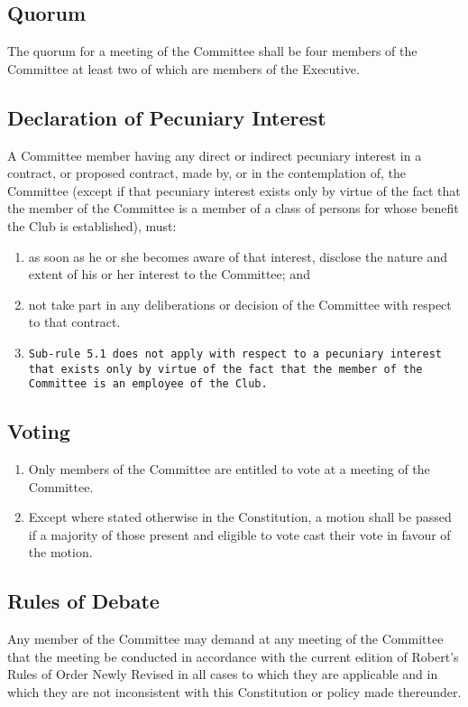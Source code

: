 \documentclass[11pt]{article} %
\begin{document}
\subsection{Quorum}
The quorum for a meeting of the Committee shall be four members of the Committee at least two of which are members of the Executive.

\subsection{Declaration of Pecuniary Interest}
A Committee member having any direct or indirect pecuniary interest in a contract, or proposed contract, made by, or in the contemplation of, the Committee (except if that pecuniary interest exists only by virtue of the fact that the member of the Committee is a member of a class of persons for whose benefit the Club is established), must:
\begin{enumerate}
	\item as soon as he or she becomes aware of that interest, disclose the nature and extent of his or her interest to the Committee; and
	\item not take part in any deliberations or decision of the Committee with respect to that contract.
	\item[] \texttt{Sub-rule 5.1 does not apply with respect to a pecuniary interest that exists only by virtue of the fact that the member of the Committee is an employee of the Club.}
\end{enumerate}

\subsection{Voting}
\begin{enumerate}
	\item Only members of the Committee are entitled to vote at a meeting of the Committee.
	\item Except where stated otherwise in the Constitution, a motion shall be passed if a majority of those present and eligible to vote cast their vote in favour of the motion.
\end{enumerate}

\subsection{Rules of Debate}
Any member of the Committee may demand at any meeting of the Committee that the meeting be conducted in accordance with the current edition of Robert’s Rules of Order Newly Revised in all cases to which they are applicable and in which they are not inconsistent with this Constitution or policy made thereunder.
\end{document}
